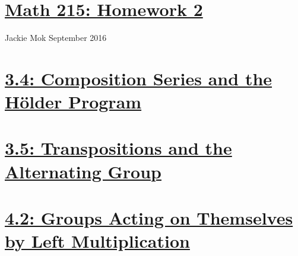 \documentclass{article}
\begin{document}
\section*{\underline{Math 215: Homework 2}}
Jackie Mok
 September 2016

\section*{\underline{3.4: Composition Series and the H\"older Program}}




\section*{\underline{3.5: Transpositions and the Alternating Group}}


\section*{\underline{4.2: Groups Acting on Themselves by Left Multiplication}}


\end{document}
